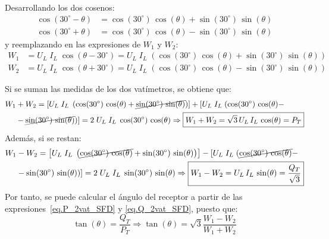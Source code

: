 \documentclass[11pt]{book} %
\begin{document}
	Desarrollando los dos cosenos:
\begin{align*}
  \cos({30^\circ} - \theta) &= \cos({30^\circ})\,\cos(\theta) + \sin({30^\circ})\,\sin(\theta)\\
  \cos({30^\circ} + \theta) &= \cos({30^\circ})\,\cos(\theta) - \sin({30^\circ})\,\sin(\theta)
\end{align*}
y reemplazando en las expresiones de $W_1$ y $W_2$:
\begin{align*}
    W_1&=U_L\;I_L\;\cos{(\theta-30^\circ)}=U_L\;I_L\;\left( \cos({30^\circ})\,\cos(\theta) + \sin({30^\circ})\,\sin(\theta)\right)\\
    W_2&=U_L\;I_L\;\cos{(\theta+30^\circ)}=U_L\;I_L\;\left( \cos({30^\circ})\,\cos(\theta) - \sin({30^\circ})\,\sin(\theta)\right)
\end{align*}

Si se suman las medidas de los dos vatímetros, se obtiene que:
\begin{align}\label{eq.P_2vat_SFD}
    W_1&+W_2=\left[ U_L\;I_L\;\left( \cos({30^\circ})\,\cos(\theta) + \cancel{\sin({30^\circ})\,\sin(\theta)}\right) \right] + [U_L\;I_L\;( \cos({30^\circ})\,\cos(\theta) -\nonumber\\
    &-\cancel{\sin({30^\circ})\,\sin(\theta)}) ]=2\;U_L\;I_L\;\cos({30^\circ})\,\cos(\theta) \Rightarrow \boxed{W_1 + W_2 = \sqrt{3}\,U_L\, I_L\,\cos(\theta) = P_T}
\end{align}
Además, si se restan: 
\begin{align}\label{eq.Q_2vat_SFD}
    W_1&-W_2=\left[ U_L\;I_L\;\left( \cancel{\cos({30^\circ})\,\cos(\theta)} + \sin({30^\circ})\,\sin(\theta)\right) \right] - [U_L\;I_L\;( \cancel{\cos({30^\circ})\,\cos(\theta)} -\nonumber \\
    &-\sin({30^\circ})\,\sin(\theta)) ]= 2\; U_L\;I_L\;\sin({30^\circ})\,\sin(\theta) \Rightarrow \boxed{W_1 - W_2 = U_L\, I_L\,\sin(\theta) = \dfrac{Q_T}{\sqrt{3}}}
\end{align}
Por tanto, se puede calcular el ángulo del receptor a partir de las expresiones~\eqref{eq.P_2vat_SFD} y \eqref{eq.Q_2vat_SFD}, puesto que:
\begin{equation}
    \tan(\theta) = \dfrac{Q_T}{P_T}\Rightarrow \boxed{\tan(\theta) = \sqrt{3} \frac{W_1 - W_2}{W_1 + W_2}}
\end{equation}
\end{document}
